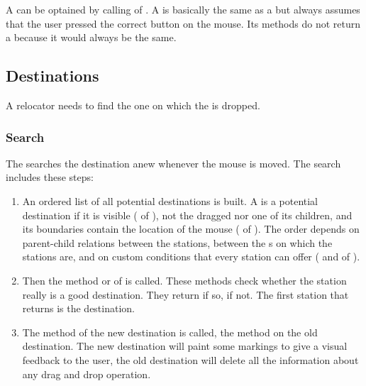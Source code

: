A  can be optained by calling  of . A  is basically the same as a  but always assumes that the user pressed the correct button on the mouse. Its methods do not return a  because it would always be the same.


\subsection{Destinations}
A relocator needs to find the one  on which the  is dropped. 

\subsubsection{Search}
The  searches the destination anew whenever the mouse is moved. The search includes these steps:
\begin{enumerate}
 \item An ordered list of all potential destinations is built. A  is a potential destination if it is visible ( of ), not the dragged  nor one of its children, and its boundaries contain the location of the mouse ( of ). The order depends on parent-child relations between the stations, between the s on which the stations are, and on custom conditions that every station can offer ( and  of ).
 \item Then the method  or  of  is called. These methods check whether the station really is a good destination. They return  if so,  if not. The first station that returns  is the destination.
 \item The method  of the new destination is called, the method  on the old destination. The new destination will paint some markings to give a visual feedback to the user, the old destination will delete all the information about any drag and drop operation.
\end{enumerate}

